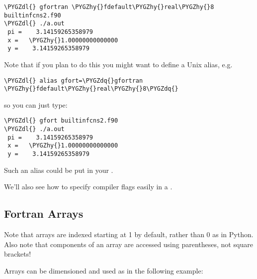 \documentclass[letterpaper,10pt,english]{sphinxmanual}
\def\PYGZdl{\char`\$}
\def\PYGZhy{\char`\-}
\def\PYGZdq{\char`\"}
\begin{document}
\begin{Verbatim}[commandchars=\\\{\}]
\PYGZdl{} gfortran \PYGZhy{}fdefault\PYGZhy{}real\PYGZhy{}8 builtinfcns2.f90
\PYGZdl{} ./a.out
 pi =    3.14159265358979
 x =   \PYGZhy{}1.00000000000000
 y =    3.14159265358979
\end{Verbatim}

Note that if you plan to do this you might want to define a Unix alias, e.g.

\begin{Verbatim}[commandchars=\\\{\}]
\PYGZdl{} alias gfort=\PYGZdq{}gfortran \PYGZhy{}fdefault\PYGZhy{}real\PYGZhy{}8\PYGZdq{}
\end{Verbatim}

so you can just type:

\begin{Verbatim}[commandchars=\\\{\}]
\PYGZdl{} gfort builtinfcns2.f90
\PYGZdl{} ./a.out
 pi =    3.14159265358979
 x =   \PYGZhy{}1.00000000000000
 y =    3.14159265358979
\end{Verbatim}

Such an alias could be put in your {\hyperref[unix:bashrc]{}}.

We'll also see how to specify compiler flags easily in a .


\subsection{Fortran Arrays}
\label{fortran:fortran-arrays}\label{fortran:id2}
Note that arrays are indexed starting at 1 by default, rather than 0 as in
Python.  Also note that components of an array are accessed using
parentheses, not square brackets!

Arrays can be dimensioned and used as in the following example:
\end{document}
